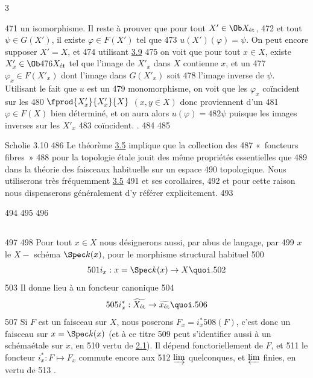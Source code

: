 3	\documentclass[10pt]{../fichiers-configuration-latex/smfart}
\begin{document}
   471	un isomorphisme. Il reste à prouver que pour tout $X'\in \Ob X_{\text{ét}}$,
   472	et tout $\psi \in G (X')$, il existe $\varphi \in F(X')$ tel que
   473	$u(X') (\varphi) = \psi$. On peut encore supposer $X'= X$, et
   474	utilisant \hyperref[VIII.prop3.9]{3.9} %
   475	on voit que pour tout $x \in X$,  existe $X'_x \in \Ob
   476	X_{\text{ét}}$ tel que l'image de $X'_x$ dans $X$ contienne $x$, et un
   477	$\varphi_x \in F(X'_x)$ dont l'image dans $G (X'_x)$ soit
   478	l'image inverse de $\psi$. Utilisant le fait que $u$ est un
   479	monomorphisme, on voit que les $\varphi_{x}$ coïncident sur les
   480	$\fprod{X'_x}{X'_x}{X}$ $(x, y \in X)$  donc proviennent d'un
   481	$\varphi \in F (X)$ bien déterminé, et on aura alors $u(\varphi) =
   482	\psi$ puisque les images inverses sur les $X'_{x}$
   483	coïncident. \cqfd.
   484	
   485	\begin{enonce*}[remark]{Scholie 3.10}
   486	Le théorème \hyperref[VIII.thm3.5]{3.5} implique que la collection des
   487	« foncteurs fibres »
   488	pour la topologie étale jouit des même propriétés essentielles que
   489	dans la théorie des faisceaux habituelle sur un espace
   490	topologique. Nous utiliserons très fréquemment \hyperref[VIII.thm3.5]{3.5}
   491	et ses corollaires,
   492	et pour cette raison nous  dispenserons généralement d'y référer explicitement.
   493	\end{enonce*}
   494	
   495	\setcounter{subsection}{10}
   496	\subsection{}
   497	
   498	Pour tout $x \in X$ nous désignerons aussi, par abus de langage, par
   499	$x$ le $X-$ schéma $\Spec k(x)$, pour le morphisme structural habituel
   500	$$
   501	i_x : x = \Spec k(x) \to X{\quoi}.
   502	$$
   503	Il donne lieu à un foncteur canonique
   504	$$
   505	i_x^{\ast} : \widetilde{X_{\text{ét}}} \to \widetilde{x_{\text{ét}}}{\quoi}.
   506	$$
   507	Si $F$ est un faisceau sur $X$, nous poserons $F_x = i^{\ast}_x
   508	(F)$, c'est donc un faisceau sur $x = \Spec k(x)$ (et à ce titre
   509	peut s'identifier aussi à un schéma\pageoriginale étale sur $x$, en
   510	vertu de \hyperref[VIII.prop2.1]{2.1}). Il dépend fonctoriellement de $F$, et
   511	le foncteur $i^{\ast}_x : F \mapsto F_x$ commute encore aux
   512	$\varinjlim$ quelconques, et $\varprojlim$ finies, en vertu de
   513	.
\end{document}
